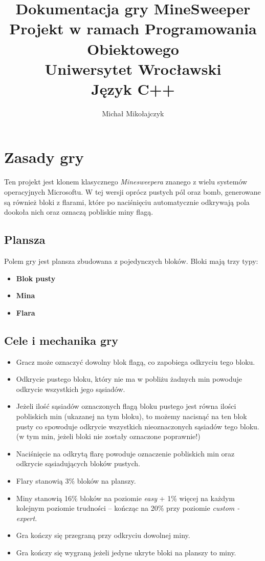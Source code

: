\documentclass[12pt,a4paper]{article}
\begin{document}
\author{Michał Mikołajczyk}
\title{
	\textbf{Dokumentacja gry MineSweeper}\\
	\large Projekt w ramach Programowania Obiektowego\\
	\large Uniwersytet Wrocławski\\
	\large Język C++
	}

\maketitle

\tableofcontents
\newpage

\section{Zasady gry}
Ten projekt jest klonem klasycznego \textit{Minesweepera} znanego z wielu systemów operacyjnych Microsoftu. W tej wersji oprócz pustych pól oraz bomb, generowane są również bloki z flarami, które po naciśnięciu automatycznie odkrywają pola dookoła nich oraz oznaczą pobliskie miny flagą.
\subsection{Plansza}
Polem gry jest plansza zbudowana z pojedynczych bloków. Bloki mają trzy typy:
\begin{itemize}
\item \textbf{Blok pusty}
\item \textbf{Mina}
\item \textbf{Flara}
\end{itemize}

\subsection{Cele i mechanika gry}
\begin{itemize}
\item Gracz może oznaczyć dowolny blok flagą, co zapobiega odkryciu tego bloku.
\item Odkrycie pustego bloku, który nie ma w pobliżu żadnych min powoduje odkrycie wszystkich jego sąsiadów.
\item Jeżeli ilość sąsiadów oznaczonych flagą bloku pustego jest równa ilości pobliskich min (ukazanej na tym bloku), to możemy nacisnąć na ten blok pusty co spowoduje odkrycie wszystkich nieoznaczonych sąsiadów tego bloku. (w tym min, jeżeli bloki nie zostały oznaczone poprawnie!)
\item Naciśnięcie na odkrytą flarę powoduje oznaczenie pobliskich min oraz odkrycie sąsiadujących bloków pustych.
\item Flary stanowią 3\% bloków na planszy.
\item Miny stanowią 16\% bloków na poziomie \textit{easy} + 1\% więcej na każdym kolejnym poziomie trudności -- kończąc na 20\% przy poziomie \textit{custom - expert}.
\item Gra kończy się przegraną przy odkryciu dowolnej miny.
\item Gra kończy się wygraną jeżeli jedyne ukryte bloki na planszy to miny.
\end{itemize}
\end{document}
